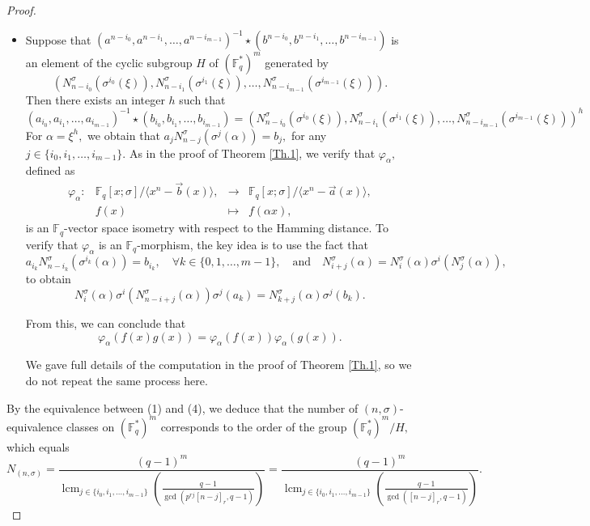 \documentclass[10pt,a4paper]{amsart}
\DeclareMathOperator{\lcm}{lcm}
\newcommand{\Fq}{\mathbb{F}_{q}}
\begin{document}
\begin{proof}
\begin{itemize}
    \item[(4) $\Rightarrow$ (1):]  
     Suppose that $ (a^{n-{i_0}}, a^{n-{i_1}} , \ldots, a^{n-i_{m-1}})^{-1}\star (b^{n-{i_0}}, b^{n-{i_1}} , \ldots, b^{n-i_{m-1}}) $ is an element of the cyclic subgroup  $H$ of $ (\Fq^{*})^m$ generated by
$$ \left( N_{n-i_0}^{\sigma}(\sigma^{i_0}(\xi)), 
N^{\sigma}_{n-i_1}(\sigma^{i_1}(\xi)), \ldots, N^{\sigma}_{n-i_{m-1}}(\sigma^{i_{m-1}}(\xi))\right) .$$
Then there exists an integer $ h$ such that 
     $$  ( a_{i_0},  a_{i_1}, \ldots, a_{i_{m-1}})^{-1}\star ( b_{i_0},  b_{i_1}, \ldots, b_{i_{m-1}}) =  \left( N_{n-i_0}^{\sigma}(\sigma^{i_0}(\xi)), 
N^{\sigma}_{n-i_1}(\sigma^{i_1}(\xi)), \ldots, N^{\sigma}_{n-i_{m-1}}(\sigma^{i_{m-1}}(\xi))\right)^h $$
    For $ \alpha= \xi^{h}, $ we obtain  that $  a_j N_{n-j}^{\sigma}(\sigma^j(\alpha))= b_j, $ for any $ j\in \{ i_0,i_1,\ldots, i_{m-1}\}.$
As in the proof of Theorem \ref{Th.1}, we verify that  $ \varphi_{\alpha}, $ defined as  
  \begin{equation}
        \begin{array}{cccc}
        \varphi_{\alpha} : & \Fq[x;\sigma]/\langle x^n - \vec{b}(x) \rangle,  & \longrightarrow & \Fq[x;\sigma] /\langle x^n - \vec{a}(x) \rangle, \\ 
        & f(x) & \longmapsto & f(\alpha x),
        \end{array}
    \end{equation} 
    is an $\Fq$-vector space  isometry with respect to the Hamming distance.
To verify that $\varphi_{\alpha}$ is an $\mathbb{F}_q$-morphism, the key idea is to use the fact that  
$$ 
a_{i_k} N^{\sigma}_{n-i_k}(\sigma^{i_k}(\alpha)) = b_{i_k}, \quad \forall k \in \{0,1,\ldots,m-1\}, \quad \text{and} \quad N_{i+j}^\sigma(\alpha) = N_i^\sigma(\alpha)\sigma^i(N_j^\sigma(\alpha)),
$$  
to  obtain 
$$ 
N_i^\sigma(\alpha)\sigma^i(N_{n-i+j}^\sigma(\alpha)) \sigma^j(a_{k}) = N^{\sigma}_{k+j}(\alpha) \sigma^{j}(b_{k}).
$$  

From this, we can conclude that  
$$ 
\varphi_{\alpha}(f(x)g(x)) = \varphi_{\alpha}(f(x))\varphi_{\alpha}(g(x)).
$$  

We gave full details of the computation in the proof of Theorem \ref{Th.1},  so we do  not repeat the same process here.
\end{itemize}

\noindent By the equivalence between (1) and (4), we deduce that the number of $(n,\sigma)$-equivalence classes  on $(\Fq^*)^m$ corresponds to the order of the group $ (\Fq^*)^m/H,$ which equals 
$$ N_{(n,\sigma)}=\dfrac{ (q-1)^m}{ \lcm_{ j\in \{i_0,i_1,\ldots, i_{m-1} \} }\left(\frac{q-1}{ \gcd(p^{r j}[n-j]_r,q-1)}\right)}=\dfrac{ (q-1)^m}{ \lcm_{ j\in \{i_0,i_1,\ldots, i_{m-1} \} }\left(\frac{q-1}{ \gcd([n-j]_r,q-1)}\right)}. $$ 


\end{proof}
\end{document}
